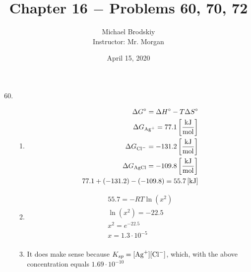 \documentclass[12pt]{article}
\title{Chapter 16 $-$ Problems 60, 70, 72}
\date{April 15, 2020}
\author{Michael Brodskiy\\ \small Instructor: Mr. Morgan}
\begin{document}
\maketitle

\begin{enumerate}

    \setcounter{enumi}{59}

  \item

    \begin{enumerate}

      \item 

        \begin{equation}
          \begin{split}
            \Delta G^{\circ} = \Delta H^{\circ} - T\Delta S^{\circ}\\
            \Delta G_{\ce{Ag+}}=77.1\left[ \frac{\si{\kilo\joule}}{\si{\mole}} \right]\\
            \Delta G_{\ce{Cl-}}=-131.2\left[ \frac{\si{\kilo\joule}}{\si{\mole}} \right]\\
            \Delta G_{\ce{AgCl}}=-109.8\left[ \frac{\si{\kilo\joule}}{\si{\mole}} \right]\\
            77.1+(-131.2)-(-109.8)=55.7\left[ \si{\kilo\joule} \right]
          \end{split}
          \label{1}
        \end{equation}

      \item 

        \begin{equation}
          \begin{split}
            55.7=-RT\ln(x^2)\\
            \ln(x^2)=-22.5\\
            x^2=e^{-22.5}\\
            x=1.3\cdot10^{-5}\\
          \end{split}
          \label{2}
        \end{equation}

      \item It does make sense because $K_{sp}=[\ce{Ag+}][\ce{Cl-}]$, which, with the above concentration equals $1.69\cdot10^{-10}$

    \end{enumerate}

    \setcounter{enumi}{69}


\end{enumerate}
\end{document}
